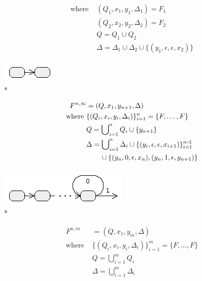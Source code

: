\documentclass{article}
\newenvironment{Xfig}
    {\par\medskip\noindent\minipage{\linewidth}\begin{center}}
    {\end{center}\endminipage\par\medskip}
\theoremstyle{definition}
\begin{document}
\begin{multicols}{2}
\begin{align*}
        \text{where }
            & (Q_1, x_1, y_1, \Delta_1) = F_1 \\
            & (Q_2, x_2, y_2, \Delta_2) = F_2 \\
            & Q = Q_1 \cup Q_2  \\
            & \Delta = \Delta_1 \cup \Delta_2 \cup \{ (y_1, \epsilon, \epsilon, x_2) \}
    \end{align*}
%
\begin{Xfig}
\includegraphics[width=0.25\linewidth]{img/tnfa/concat.png}\\*
\end{Xfig}
%
    \begin{align*}
        F^{n,\infty} &= (Q, x_1, y_{n+1}, \Delta) \\
        \text{where }
            & \{(Q_i, x_i, y_i, \Delta_i)\}_{i=1}^n = \{F, \dots, F\} \\
            & Q = \bigcup\nolimits_{i=1}^n Q_i \cup \{ y_{n+1} \} \\
            & \Delta = \bigcup\nolimits_{i=1}^n \Delta_i
                \cup \{(y_i, \epsilon, \epsilon, x_{i+1})\}_{i=1}^{n\!-\!1} \\
                & \hphantom{\hspace{2em}}
                    \cup \{ (y_n, 0, \epsilon, x_n), (y_n, 1, \epsilon, y_{n+1}) \}
    \end{align*}
%
\begin{Xfig}
\includegraphics[width=0.55\linewidth]{img/tnfa/repeat_unbound.png}\\*
\end{Xfig}
%
    \begin{align*}
        F^{n,m} &= (Q, x_1, y_m, \Delta) \\
        \text{where }
            & \{(Q_i, x_i, y_i, \Delta_i)\}_{i=1}^m = \{F, \dots, F\} \\
            & Q = \bigcup\nolimits_{i=1}^m Q_i \\
            & \Delta = \bigcup\nolimits_{i=1}^m \Delta_i

\end{align*}
\end{multicols}
\end{document}
